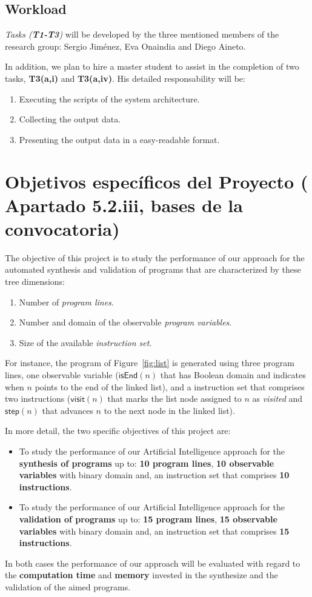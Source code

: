 \documentclass[10pt,a4paper]{paper}
\begin{document}
\subsection{Workload}

{\em Tasks ({\bf T1-T3})} will be developed by the three mentioned members of the research group: Sergio Jiménez, Eva Onaindia and Diego Aineto.

In addition, we plan to hire a master student to assist in the completion of two tasks, {\bf T3(a,i)} and {\bf T3(a,iv)}. His detailed responsability will be:
\begin{enumerate}
\item Executing the scripts of the system architecture.
\item Collecting the output data.
\item Presenting the output data in a easy-readable format.
\end{enumerate}

\newpage
\section{Objetivos específicos del Proyecto ( Apartado 5.2.iii, bases de la convocatoria)}
\label{subsec:objectivos}

The objective of this project is to study the performance of our approach for the automated synthesis and validation of programs that are characterized by these tree dimensions:
\begin{enumerate}
\item Number of {\em program lines}.
\item Number and domain of the observable {\em program variables}.
\item Size of the available {\em instruction set}.
\end{enumerate}  

For instance, the program of Figure~\ref{fig:list} is generated using three program lines, one observable variable ($\mathsf{isEnd}(n)$ that has Boolean domain and indicates when $n$ points to the end of the linked list), and a instruction set that comprises two instructions ($\mathsf{visit}(n)$ that marks the list node assigned to $n$ as {\em visited} and $\mathsf{step}(n)$ that advances $n$ to the next node in the linked list).

In more detail, the two specific objectives of this project are:
\begin{itemize}
\item To study the performance of our Artificial Intelligence approach for the {\bf synthesis of programs} up to: {\bf 10 program lines}, {\bf 10 observable variables} with binary domain and, an instruction set that comprises {\bf 10 instructions}. 
\item To study the performance of our Artificial Intelligence approach for the {\bf validation of programs} up to: {\bf 15 program lines}, {\bf 15 observable variables} with binary domain and, an instruction set that comprises {\bf 15 instructions}. 
\end{itemize}
In both cases the performance of our approach will be evaluated with regard to the {\bf computation time} and {\bf memory} invested in the synthesize and the validation of the aimed programs.
\end{document}
